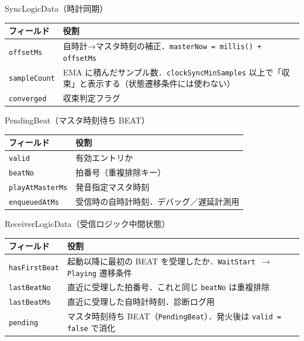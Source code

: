 \documentclass[lualatex,book,paper=a4paper,jafontsize=11.5pt,jafontscale=1.05]{jlreq}
\begin{document}
\begin{apibox}{SyncLogicData（時計同期）}
\begin{tabular}{l p{}}
\toprule
\textbf{フィールド} & \textbf{役割} \\
\midrule
\texttt{offsetMs}    & 自時計→マスタ時刻の補正．\texttt{masterNow = millis() + offsetMs} \\
\texttt{sampleCount} & EMA に積んだサンプル数．\texttt{clockSyncMinSamples} 以上で「収束」と表示する（状態遷移条件には使わない） \\
\texttt{converged}   & 収束判定フラグ \\
\bottomrule
\end{tabular}
\end{apibox}

\begin{apibox}{PendingBeat（マスタ時刻待ち BEAT）}
\begin{tabular}{l p{}}
\toprule
\textbf{フィールド} & \textbf{役割} \\
\midrule
\texttt{valid}          & 有効エントリか \\
\texttt{beatNo}         & 拍番号（重複排除キー） \\
\texttt{playAtMasterMs} & 発音指定マスタ時刻 \\
\texttt{enqueuedAtMs}   & 受信時の自時計時刻．デバッグ／遅延計測用 \\
\bottomrule
\end{tabular}
\end{apibox}

\begin{apibox}{ReceiverLogicData（受信ロジック中間状態）}
\begin{tabular}{l p{}}
\toprule
\textbf{フィールド} & \textbf{役割} \\
\midrule
\texttt{hasFirstBeat}   & 起動以降に最初の BEAT を受理したか．\texttt{WaitStart $\to$ Playing} 遷移条件 \\
\texttt{lastBeatNo}     & 直近に受理した拍番号．これと同じ \texttt{beatNo} は重複排除 \\
\texttt{lastBeatMs}     & 直近に受理した自時計時刻．診断ログ用 \\
\texttt{pending}        & マスタ時刻待ち BEAT（\texttt{PendingBeat}）．発火後は \texttt{valid = false} で消化 \\
\bottomrule
\end{tabular}
\end{apibox}
\end{document}
